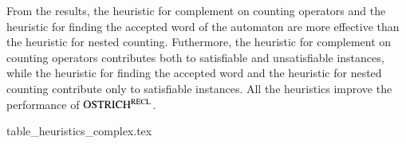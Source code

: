 From the results, the heuristic for complement on counting operators and the heuristic for finding the accepted word of the automaton are more effective than the heuristic for nested counting. Futhermore, the heuristic for complement on counting operators contributes both to satisfiable and unsatisfiable instances, while the heuristic for finding the accepted word and the heuristic for nested counting contribute only to satisfiable instances.
All the heuristics improve the performance of $\rm OSTRICH^{RECL}$.

\begin{table}
  {table_heuristics_complex.tex}
  \caption{Empirical justification of the heuristics on ComplexCounting benchmarks}\label{tab:results_heuristic_complex}
\end{table}


